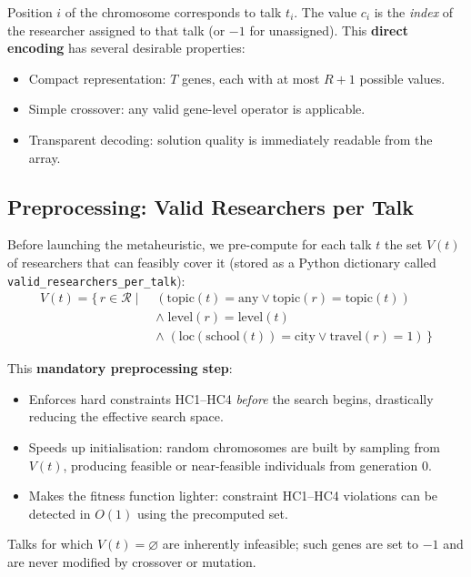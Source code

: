 \documentclass[12pt, a4paper]{article}
\begin{document}
Position $i$ of the chromosome corresponds to talk $t_i$. The value $c_i$ is the
\emph{index} of the researcher assigned to that talk (or $-1$ for unassigned). This
\textbf{direct encoding} has several desirable properties:
\begin{itemize}[itemsep=0.1em]
  \item Compact representation: $T$ genes, each with at most $R+1$ possible values.
  \item Simple crossover: any valid gene-level operator is applicable.
  \item Transparent decoding: solution quality is immediately readable from the array.
\end{itemize}

\subsection{Preprocessing: Valid Researchers per Talk}

Before launching the metaheuristic, we pre-compute for each talk $t$ the set
$V(t)$ of researchers that can feasibly cover it (stored as a Python dictionary
called \texttt{valid\_r\-es\-ear\-chers\_per\_talk}):
\begin{align}
  V(t) = \{\, r \in \mathcal{R} \mid\;
            &(\text{topic}(t) = \text{any} \lor \text{topic}(r) = \text{topic}(t))\nonumber\\
            &\land\; \text{level}(r) = \text{level}(t)\nonumber\\
            &\land\; (\text{loc}(\text{school}(t)) = \text{city} \lor \text{travel}(r) = 1)
            \,\}\nonumber
\end{align}

This \textbf{mandatory preprocessing step}:
\begin{itemize}[itemsep=0.1em]
  \item Enforces hard constraints HC1–HC4 \emph{before} the search begins, drastically
        reducing the effective search space.
  \item Speeds up initialisation: random chromosomes are built by sampling from $V(t)$,
        producing feasible or near-feasible individuals from generation 0.
  \item Makes the fitness function lighter: constraint HC1–HC4 violations can be detected
        in $O(1)$ using the precomputed set.
\end{itemize}

Talks for which $V(t) = \varnothing$ are inherently infeasible; such genes are set to
$-1$ and are never modified by crossover or mutation.
\end{document}
